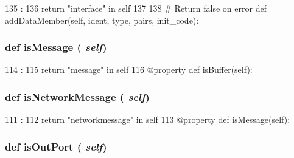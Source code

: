 \begin{DoxyCode}
135                          :
136         return "interface" in self
137 
138     # Return false on error
    def addDataMember(self, ident, type, pairs, init_code):
\end{DoxyCode}
\hypertarget{classslicc_1_1symbols_1_1Type_1_1Type_a94bbf26edb7ac380f1b61e99fb45ffcf}{
\subsubsection[{isMessage}]{\setlength{\rightskip}{0pt plus 5cm}def isMessage ( {\em self})}}
\label{classslicc_1_1symbols_1_1Type_1_1Type_a94bbf26edb7ac380f1b61e99fb45ffcf}



\begin{DoxyCode}
114                        :
115         return "message" in self
116     @property
    def isBuffer(self):
\end{DoxyCode}
\hypertarget{classslicc_1_1symbols_1_1Type_1_1Type_aae25790df73780663d6afb3a7262665b}{
\subsubsection[{isNetworkMessage}]{\setlength{\rightskip}{0pt plus 5cm}def isNetworkMessage ( {\em self})}}
\label{classslicc_1_1symbols_1_1Type_1_1Type_aae25790df73780663d6afb3a7262665b}



\begin{DoxyCode}
111                               :
112         return "networkmessage" in self
113     @property
    def isMessage(self):
\end{DoxyCode}
\hypertarget{classslicc_1_1symbols_1_1Type_1_1Type_a2095c07646682ecf212fb564006b19be}{
\subsubsection[{isOutPort}]{\setlength{\rightskip}{0pt plus 5cm}def isOutPort ( {\em self})}}
\label{classslicc_1_1symbols_1_1Type_1_1Type_a2095c07646682ecf212fb564006b19be}



